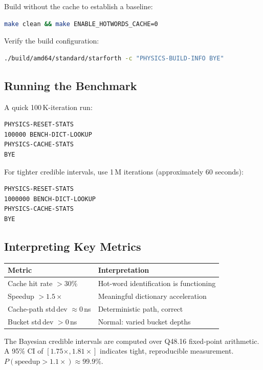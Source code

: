 Build without the cache to establish a baseline:

\begin{lstlisting}[language=bash]
make clean && make ENABLE_HOTWORDS_CACHE=0
\end{lstlisting}

Verify the build configuration:

\begin{lstlisting}[language=bash]
./build/amd64/standard/starforth -c "PHYSICS-BUILD-INFO BYE"
\end{lstlisting}

\subsection{Running the Benchmark}

A quick 100\,K-iteration run:

\begin{lstlisting}[language=forth]
PHYSICS-RESET-STATS
100000 BENCH-DICT-LOOKUP
PHYSICS-CACHE-STATS
BYE
\end{lstlisting}

For tighter credible intervals, use 1\,M iterations (approximately 60
seconds):

\begin{lstlisting}[language=forth]
PHYSICS-RESET-STATS
1000000 BENCH-DICT-LOOKUP
PHYSICS-CACHE-STATS
BYE
\end{lstlisting}

\subsection{Interpreting Key Metrics}

\begin{center}
\begin{tabular}{lp{7cm}}
\toprule
Metric & Interpretation \\
\midrule
Cache hit rate $> 30\%$    & Hot-word identification is functioning \\
Speedup $> 1.5\times$      & Meaningful dictionary acceleration \\
Cache-path std\,dev $\approx 0$\,ns & Deterministic path, correct \\
Bucket std\,dev $> 0$\,ns  & Normal: varied bucket depths \\
\bottomrule
\end{tabular}
\end{center}

The Bayesian credible intervals are computed over Q48.16 fixed-point
arithmetic. A 95\% CI of $[1.75\times, 1.81\times]$ indicates tight,
reproducible measurement. $P(\text{speedup} > 1.1\times) \approx 99.9\%$.

